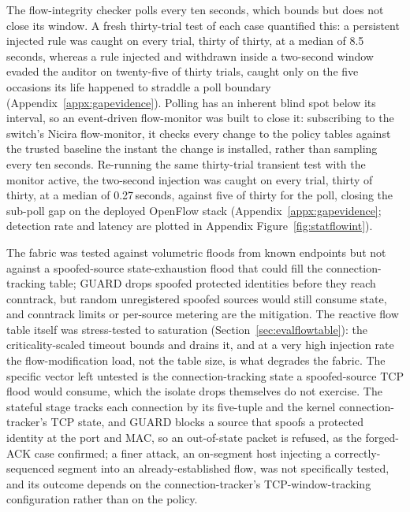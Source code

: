 The flow-integrity checker polls every ten seconds, which bounds but does not close its window. A fresh thirty-trial test of each case quantified this: a persistent injected rule was caught on every trial, thirty of thirty, at a median of 8.5\,seconds, whereas a rule injected and withdrawn inside a two-second window evaded the auditor on twenty-five of thirty trials, caught only on the five occasions its life happened to straddle a poll boundary (Appendix~\ref{appx:gapevidence}). Polling has an inherent blind spot below its interval, so an event-driven flow-monitor was built to close it: subscribing to the switch's Nicira flow-monitor, it checks every change to the policy tables against the trusted baseline the instant the change is installed, rather than sampling every ten seconds. Re-running the same thirty-trial transient test with the monitor active, the two-second injection was caught on every trial, thirty of thirty, at a median of 0.27\,seconds, against five of thirty for the poll, closing the sub-poll gap on the deployed OpenFlow stack (Appendix~\ref{appx:gapevidence}; detection rate and latency are plotted in Appendix Figure~\ref{fig:statflowint}).

The fabric was tested against volumetric floods from known endpoints but not against a spoofed-source state-exhaustion flood that could fill the connection-tracking table; GUARD drops spoofed protected identities before they reach conntrack, but random unregistered spoofed sources would still consume state, and conntrack limits or per-source metering are the mitigation. The reactive flow table itself was stress-tested to saturation (Section~\ref{sec:evalflowtable}): the criticality-scaled timeout bounds and drains it, and at a very high injection rate the flow-modification load, not the table size, is what degrades the fabric. The specific vector left untested is the connection-tracking state a spoofed-source TCP flood would consume, which the isolate drops themselves do not exercise. The stateful stage tracks each connection by its five-tuple and the kernel connection-tracker's TCP state, and GUARD blocks a source that spoofs a protected identity at the port and MAC, so an out-of-state packet is refused, as the forged-ACK case confirmed; a finer attack, an on-segment host injecting a correctly-sequenced segment into an already-established flow, was not specifically tested, and its outcome depends on the connection-tracker's TCP-window-tracking configuration rather than on the policy.

